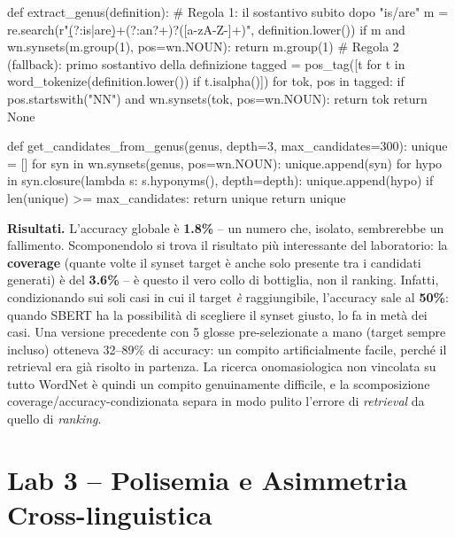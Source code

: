 \documentclass[11pt,a4paper]{article}
\begin{document}
\begin{pylisting}[title={Estrazione del genus e generazione dei candidati dagli iponimi}]
def extract_genus(definition):
    # Regola 1: il sostantivo subito dopo "is/are"
    m = re.search(r"\b(?:is|are)\b\s+(?:an?\s+)?([a-zA-Z-]+)",
                  definition.lower())
    if m and wn.synsets(m.group(1), pos=wn.NOUN):
        return m.group(1)
    # Regola 2 (fallback): primo sostantivo della definizione
    tagged = pos_tag([t for t in word_tokenize(definition.lower())
                       if t.isalpha()])
    for tok, pos in tagged:
        if pos.startswith("NN") and wn.synsets(tok, pos=wn.NOUN):
            return tok
    return None

def get_candidates_from_genus(genus, depth=3, max_candidates=300):
    unique = []
    for syn in wn.synsets(genus, pos=wn.NOUN):
        unique.append(syn)
        for hypo in syn.closure(lambda s: s.hyponyms(), depth=depth):
            unique.append(hypo)
            if len(unique) >= max_candidates:
                return unique
    return unique
\end{pylisting}

\textbf{Risultati.} L'accuracy globale è \textbf{1.8\%} -- un numero che, isolato, sembrerebbe un fallimento. Scomponendolo si trova il risultato più interessante del laboratorio: la \textbf{coverage} (quante volte il synset target è anche solo presente tra i candidati generati) è del \textbf{3.6\%} -- è questo il vero collo di bottiglia, non il ranking. Infatti, condizionando sui soli casi in cui il target \emph{è} raggiungibile, l'accuracy sale al \textbf{50\%}: quando SBERT ha la possibilità di scegliere il synset giusto, lo fa in metà dei casi. Una versione precedente con 5 glosse pre-selezionate a mano (target sempre incluso) otteneva 32--89\% di accuracy: un compito artificialmente facile, perché il retrieval era già risolto in partenza. La ricerca onomasiologica non vincolata su tutto WordNet è quindi un compito genuinamente difficile, e la scomposizione coverage/accuracy-condizionata separa in modo pulito l'errore di \emph{retrieval} da quello di \emph{ranking}.

\section{Lab 3 -- Polisemia e Asimmetria Cross-linguistica}
\end{document}
